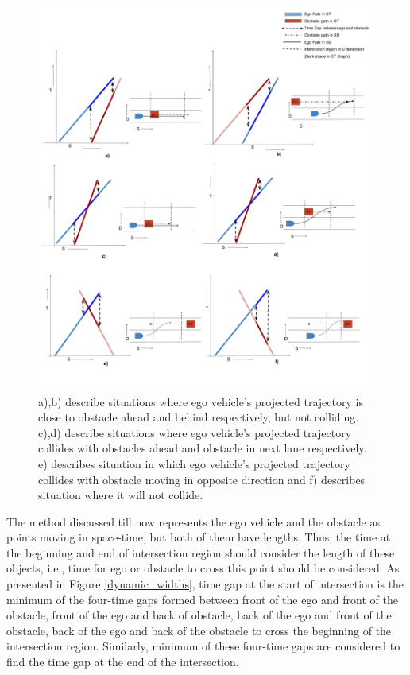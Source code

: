\begin{figure}
	\centering
	\includegraphics[width=1.1\textwidth]{Images/concept/dynamic_collision_lines.jpg}
	\caption{a),b) describe situations where ego vehicle's projected trajectory is close to obstacle ahead and behind respectively, but not colliding. \newline 
		c),d) describe situations where ego vehicle's projected trajectory collides with obstacles ahead and obstacle in next lane respectively. \newline
		e) describes situation in which ego vehicle's projected trajectory collides with obstacle moving in opposite direction and f) describes situation where it will not collide. 
	}
	\label{dynamic_obst_all}
\end{figure}

The method discussed till now represents the ego vehicle and the obstacle as points moving in space-time, but both of them have lengths. Thus, the time at the beginning and end of intersection region should consider the length of these objects, i.e., time for ego or obstacle to cross this point should be considered. As presented in Figure \ref{dynamic_widths}, time gap at the start of intersection is the minimum of the four-time gaps formed between front of the ego and front of the obstacle, front of the ego and back of obstacle, back of the ego and front of the obstacle, back of the ego and back of the obstacle to cross the beginning of the intersection region. Similarly, minimum of these four-time gaps are considered to find the time gap at the end of the intersection.

